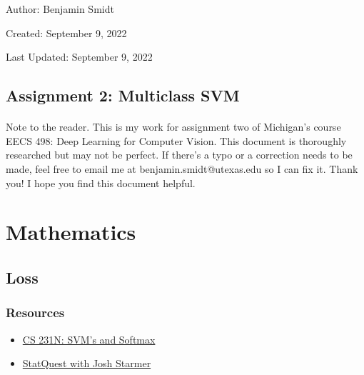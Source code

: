 \documentclass[12pt]{article}
\begin{document}
\noindent Author: Benjamin Smidt

\noindent Created: September 9, 2022

\noindent Last Updated: September 9, 2022
\begin{center}
\section*{Assignment 2: Multiclass SVM}
\end{center}

\paragraph{} Note to the reader. This is my work for assignment two of Michigan's course
EECS 498: Deep Learning for Computer Vision. This document is thoroughly researched but
may not be perfect. If there's a typo or a correction needs to be made, feel free to 
email me at benjamin.smidt@utexas.edu so I can fix it. Thank you! I hope you find this 
document helpful.

\tableofcontents{}

\section{Mathematics}
\subsection{Loss}

\subsubsection*{Resources}
\begin{itemize}
    \item \href{https://cs231n.github.io/linear-classify/#svm-vs-softmax}{CS 231N: SVM's and Softmax }
    \item \href{https://www.youtube.com/watch?v=efR1C6CvhmE}{StatQuest with Josh Starmer}
\end{itemize}
\end{document}
